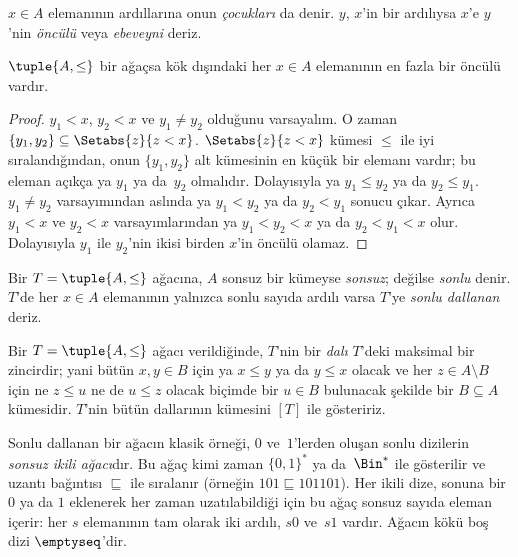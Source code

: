 \documentclass[../../../include/open-logic-section]{subfiles}
\begin{document}
$x \in A$ elemanının ardıllarına onun \emph{çocukları} da denir. $y$, $x$'in bir
ardılıysa $x$'e $y$'nin \emph{öncülü} veya \emph{ebeveyni} deriz.

\begin{prop}
$\tuple{A,\le}$ bir ağaçsa kök dışındaki her $x \in A$ elemanının en fazla bir
öncülü vardır.
\end{prop}

\begin{proof}
  $y_1<x$, $y_2<x$ ve $y_1\neq y_2$ olduğunu varsayalım. O zaman
  $\{y_1,y_2\}\subseteq\Setabs{z}{z<x}$. $\Setabs{z}{z<x}$ kümesi $\le$ ile
  iyi sıralandığından, onun $\{y_1,y_2\}$ alt kümesinin en küçük bir elemanı
  vardır; bu eleman açıkça ya $y_1$ ya da~$y_2$ olmalıdır. Dolayısıyla ya
  $y_1\le y_2$ ya da $y_2\le y_1$. $y_1\neq y_2$ varsayımından aslında ya
  $y_1<y_2$ ya da $y_2<y_1$ sonucu çıkar. Ayrıca $y_1<x$ ve $y_2<x$
  varsayımlarından ya $y_1<y_2<x$ ya da $y_2<y_1<x$ olur. Dolayısıyla $y_1$
  ile $y_2$'nin ikisi birden $x$'in öncülü olamaz.
\end{proof}

\begin{defn}
Bir $T=\tuple{A,\le}$ ağacına, $A$ sonsuz bir kümeyse \emph{sonsuz}; değilse
\emph{sonlu} denir. $T$'de her $x \in A$ elemanının yalnızca sonlu sayıda ardılı
varsa $T$'ye \emph{sonlu dallanan} deriz.
\end{defn}

\begin{defn}[Dallar]
Bir $T=\tuple{A,\le}$ ağacı verildiğinde, $T$'nin bir \emph{dalı} $T$'deki
maksimal bir zincirdir; yani bütün $x,y \in B$ için ya $x\le y$ ya da
$y\le x$ olacak ve her $z \in A\setminus B$ için ne $z\le u$ ne de $u\le z$
olacak biçimde bir $u \in B$ bulunacak şekilde bir $B \subseteq A$ kümesidir.
%
$T$'nin bütün dallarının kümesini $[T]$ ile gösteririz.
\end{defn}

\begin{ex}
Sonlu dallanan bir ağacın klasik örneği, $0$ ve~$1$'lerden oluşan sonlu
dizilerin \emph{sonsuz ikili ağacı}dır. Bu ağaç kimi zaman $\{0,1\}^*$ ya
da~$\Bin^*$ ile gösterilir ve uzantı bağıntısı $\sqsubseteq$ ile sıralanır
(örneğin $101 \sqsubseteq 101101$). Her ikili dize, sonuna bir $0$ ya da $1$
eklenerek her zaman uzatılabildiği için bu ağaç sonsuz sayıda eleman içerir:
her $s$ elemanının tam olarak iki ardılı, $s0$ ve~$s1$ vardır. Ağacın kökü boş
dizi $\emptyseq$'dir.
\end{ex}
\end{document}
